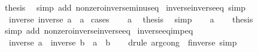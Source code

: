 \begin{isabellebody}
\ {\isacharquery}{\kern0pt}thesis\ \isamarkupfalse%
\ {\isacharparenleft}{\kern0pt}simp\ add{\isacharcolon}{\kern0pt}\ nonzero{\isacharunderscore}{\kern0pt}inverse{\isacharunderscore}{\kern0pt}minus{\isacharunderscore}{\kern0pt}eq{\isacharparenright}{\kern0pt}\isanewline
{}\isamarkupfalse%
%
\endisatagproof
{\isafoldproof}%
%
\isadelimproof
\isanewline
%
\endisadelimproof
\isanewline
{}\isamarkupfalse%
\ inverse{\isacharunderscore}{\kern0pt}inverse{\isacharunderscore}{\kern0pt}eq\ {\isacharbrackleft}{\kern0pt}simp{\isacharbrackright}{\kern0pt}{\isacharcolon}{\kern0pt}\isanewline
\ \ {\isachardoublequoteopen}inverse\ {\isacharparenleft}{\kern0pt}inverse\ a{\isacharparenright}{\kern0pt}\ {\isacharequal}{\kern0pt}\ a{\isachardoublequoteclose}\isanewline
%
\isadelimproof
%
\endisadelimproof
%
\isatagproof
{}\isamarkupfalse%
\ cases\isanewline
\ \ \isamarkupfalse%
\ {\isachardoublequoteopen}a{\isacharequal}{\kern0pt}{}{\isachardoublequoteclose}\ \isamarkupfalse%
\ {\isacharquery}{\kern0pt}thesis\ \isamarkupfalse%
\ simp\isanewline
{}\isamarkupfalse%
\isanewline
\ \ \isamarkupfalse%
\ {\isachardoublequoteopen}a{\isasymnoteq}{}{\isachardoublequoteclose}\isanewline
\ \ \isamarkupfalse%
\ {\isacharquery}{\kern0pt}thesis\ \isamarkupfalse%
\ {\isacharparenleft}{\kern0pt}simp\ add{\isacharcolon}{\kern0pt}\ nonzero{\isacharunderscore}{\kern0pt}inverse{\isacharunderscore}{\kern0pt}inverse{\isacharunderscore}{\kern0pt}eq{\isacharparenright}{\kern0pt}\isanewline
{}\isamarkupfalse%
%
\endisatagproof
{\isafoldproof}%
%
\isadelimproof
\isanewline
%
\endisadelimproof
\isanewline
{}\isamarkupfalse%
\ inverse{\isacharunderscore}{\kern0pt}eq{\isacharunderscore}{\kern0pt}imp{\isacharunderscore}{\kern0pt}eq{\isacharcolon}{\kern0pt}\isanewline
\ \ {\isachardoublequoteopen}inverse\ a\ {\isacharequal}{\kern0pt}\ inverse\ b\ {\isasymLongrightarrow}\ a\ {\isacharequal}{\kern0pt}\ b{\isachardoublequoteclose}\isanewline
%
\isadelimproof
\ \ %
\endisadelimproof
%
\isatagproof
{}\isamarkupfalse%
\ {\isacharparenleft}{\kern0pt}drule\ arg{\isacharunderscore}{\kern0pt}cong\ {\isacharbrackleft}{\kern0pt}\ f{\isacharequal}{\kern0pt}{\isachardoublequoteopen}inverse{\isachardoublequoteclose}{\isacharbrackright}{\kern0pt}{\isacharcomma}{\kern0pt}\ simp{\isacharparenright}{\kern0pt}%
\endisatagproof
{\isafoldproof}%
%
\isadelimproof
\isanewline

\end{isabellebody}
